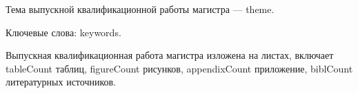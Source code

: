 
Тема выпускной квалификационной работы магистра --- {{theme}}.

Ключевые слова: {{keywords}}.

Выпускная квалификационная работа магистра изложена на \pageref{LastPage} листах, включает {{tableCount}} таблиц, {{figureCount}} рисунков, 
{{appendixCount}} приложение, {{biblCount}} литературных источников.

\clearpage
